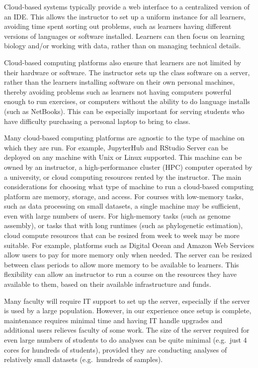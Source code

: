 Cloud-based systems typically provide a web interface to a centralized version of an IDE. This 
allows the instructor to set up a uniform instance for all learners, avoiding time spent sorting out problems, such as learners having different versions of languages or software installed.
Learners can then focus on learning biology and/or working with data, rather than on managing technical details.

Cloud-based computing platforms also ensure that learners
are not limited by their hardware or software. The instructor sets up the class software on a server, rather than the learners installing software on their own personal machines, thereby avoiding problems such as learners not having computers powerful enough to run exercises, or computers without the ability to do language installs (such as NetBooks). This can be especially important for serving students who have difficulty purchasing a personal laptop to bring to class.

Many cloud-based computing platforms are agnostic to the type of machine on which they are run. 
For example, JupyterHub and RStudio Server can be deployed on any machine with Unix or Linux supported. 
This machine can be owned by an instructor, a high-performance cluster (HPC) computer operated by a university, or cloud 
computing resources rented by the instructor.
The main considerations for choosing what type of machine to run a cloud-based computing platform are memory, storage, and access.
For courses with low-memory tasks, such as data processing on small datasets, a single machine may be sufficient, even with large numbers of users.
For high-memory tasks (such as genome assembly), or tasks that with long runtimes (such as phylogenetic estimation), 
cloud compute resources that can be resized from week to week may be more suitable.
For example, platforms such as Digital Ocean and Amazon Web Services allow users to pay for more memory only when needed. 
The server can be resized between class periods to allow more memory to be available to learners.
This flexibility can allow an instructor to run a course on the resources they have available to them, based on their available infrastructure and funds.

Many faculty will require IT support to set up the server, especially if the server is used by a large population. However, in our experience once setup is complete, maintenance requires minimal time and having IT handle upgrades and additional users relieves faculty of some work. The size of the server required for even large numbers of students to do analyses can be quite minimal (e.g.\ just 4 cores for hundreds of students), provided they are conducting analyses of relatively small datasets (e.g.\ hundreds of samples). 

